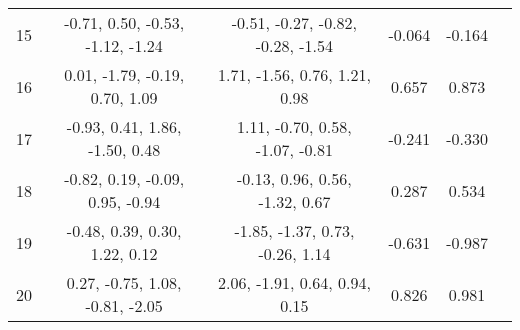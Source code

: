 \documentclass[11pt]{article}
\begin{document}
\begin{table}[ht]
\begin{tabular}{ | c | c | c | c | c | c |}
15 & \tiny -0.71, 0.50, -0.53, -1.12, -1.24 & \tiny -0.51, -0.27, -0.82, -0.28, -1.54 & \tiny -0.064 & \tiny -0.164 & \\
16 & \tiny 0.01, -1.79, -0.19, 0.70, 1.09 & \tiny 1.71, -1.56, 0.76, 1.21, 0.98 & \tiny 0.657 & \tiny 0.873 & \\
17 & \tiny -0.93, 0.41, 1.86, -1.50, 0.48 & \tiny 1.11, -0.70, 0.58, -1.07, -0.81 & \tiny -0.241 & \tiny -0.330 & \\
18 & \tiny -0.82, 0.19, -0.09, 0.95, -0.94 & \tiny -0.13, 0.96, 0.56, -1.32, 0.67 & \tiny 0.287 & \tiny 0.534 & \\
19 & \tiny -0.48, 0.39, 0.30, 1.22, 0.12 & \tiny -1.85, -1.37, 0.73, -0.26, 1.14 & \tiny -0.631 & \tiny -0.987 & \\
20 & \tiny 0.27, -0.75, 1.08, -0.81, -2.05 & \tiny 2.06, -1.91, 0.64, 0.94, 0.15 & \tiny 0.826 & \tiny 0.981 & \\
\hline
\end{tabular}
\label{table:sim0d}\end{table}
\end{document}
